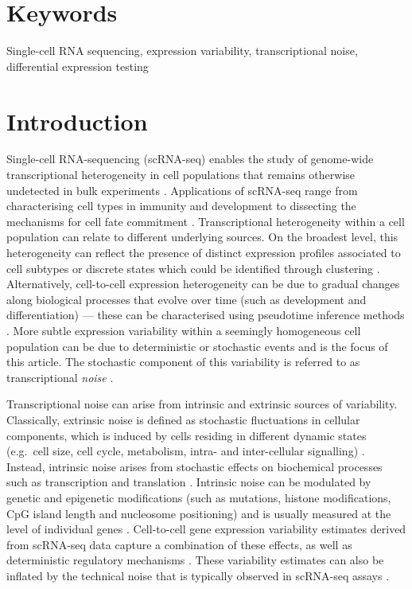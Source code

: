 \documentclass[9pt,a4paper,]{extarticle}
\begin{document}
\section*{Keywords}
Single-cell RNA sequencing, expression variability, transcriptional noise, differential expression testing


\clearpage
\pagestyle{main}

\hypertarget{introduction}{%
\section{Introduction}\label{introduction}}

Single-cell RNA-sequencing (scRNA-seq) enables the study of genome-wide
transcriptional heterogeneity in cell populations that remains otherwise
undetected in bulk experiments \citep{Stegle2015, Prakadan2017, Patange2018}.
Applications of scRNA-seq range from characterising cell types in immunity
\citep{Lonnberg2017, Villani2017, Zheng2017} and development \citep{Ibarra-Soria2018, Wagner2018, Pijuan-Sala2019} to dissecting the mechanisms for cell fate
commitment \citep{Goolam2016, Ohnishi2014}.
Transcriptional heterogeneity within a cell population can relate to different
underlying sources.
On the broadest level, this heterogeneity can reflect the presence of distinct
expression profiles associated to cell subtypes or discrete states which could
be identified through clustering \citep{Kiselev2019}.
Alternatively, cell-to-cell expression heterogeneity can be due to gradual
changes along biological processes that evolve over time (such as
development and differentiation) --- these can be characterised using pseudotime
inference methods \citep{Saelens2019}.
More subtle expression variability within a seemingly homogeneous cell
population can be due to deterministic or stochastic events and is the focus
of this article.
The stochastic component of this variability is referred to as transcriptional
\emph{noise} \citep{Elowitz2002, Eling2019}.

Transcriptional noise can arise from intrinsic and extrinsic sources of
variability. Classically, extrinsic noise is defined as stochastic fluctuations
in cellular components, which is induced by cells residing in different dynamic
states (e.g.~cell size, cell cycle, metabolism, intra- and inter-cellular
signalling) \citep{Zopf2013, Iwamoto2016, Kiviet2014}.
Instead, intrinsic noise arises from stochastic effects on biochemical
processes such as transcription and translation \citep{Elowitz2002}.
Intrinsic noise can be modulated by genetic and epigenetic modifications (such
as mutations, histone modifications, CpG island length and nucleosome
positioning) \citep{Eberwine2015, Faure2017, Morgan2018} and is usually measured
at the level of individual genes \citep{Elowitz2002}. Cell-to-cell gene expression
variability estimates derived from scRNA-seq data capture a combination of
these effects, as well as deterministic regulatory mechanisms \citep{Eling2019}.
These variability estimates can also be inflated by the technical noise that is
typically observed in scRNA-seq assays \citep{Brennecke2013}.
\end{document}
